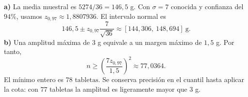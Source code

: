 \textbf{a)} La media muestral es $5274/36=146{,}5$ g. Con $\sigma=7$ conocida y confianza del $94\%$, usamos $z_{0{,}97}\approx1{,}8807936$. El intervalo normal es
\[
146{,}5\pm z_{0{,}97}\frac7{\sqrt{36}}
\approx\boxed{[144{,}306,\ 148{,}694]}\ \text{g}.
\]
\textbf{b)} Una amplitud máxima de $3$ g equivale a un margen máximo de $1{,}5$ g. Por tanto,
\[
n\ge\left(\frac{7z_{0{,}97}}{1{,}5}\right)^2\approx77{,}0364.
\]
El mínimo entero es $\boxed{78\text{ tabletas}}$. Se conserva precisión en el cuantil hasta aplicar la cota: con $77$ tabletas la amplitud es ligeramente mayor que $3$ g.
